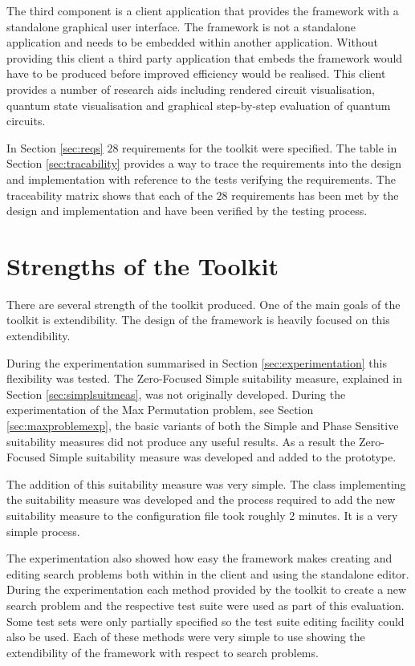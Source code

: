The third component is a client application that provides the framework with a standalone graphical user interface.
The framework is not a standalone application and needs to be embedded within another application.
Without providing this client a third party application that embeds the framework would have to be produced before improved efficiency would be realised.
This client provides a number of research aids including rendered circuit visualisation, quantum state visualisation and graphical step-by-step evaluation of quantum circuits.

In Section \ref{sec:reqs} $28$ requirements for the toolkit were specified.
The table in Section \ref{sec:tracability} provides a way to trace the requirements into the design and implementation with reference to the tests verifying the requirements.
The traceability matrix shows that each of the $28$ requirements has been met by the design and implementation and have been verified by the testing process.

\section{Strengths of the Toolkit}

There are several strength of the toolkit produced.
One of the main goals of the toolkit is extendibility.
The design of the framework is heavily focused on this extendibility.

During the experimentation summarised in Section \ref{sec:experimentation} this flexibility was tested.
The Zero-Focused Simple suitability measure, explained in Section \ref{sec:simplsuitmeas}, was not originally developed.
During the experimentation of the Max Permutation problem, see Section \ref{sec:maxproblemexp}, the basic variants of both the Simple and Phase Sensitive suitability measures did not produce any useful results.
As a result the Zero-Focused Simple suitability measure was developed and added to the prototype.

The addition of this suitability measure was very simple.
The class implementing the suitability measure was developed and the process required to add the new suitability measure to the configuration file took roughly 2 minutes.
It is a very simple process.

The experimentation also showed how easy the framework makes creating and editing search problems both within in the client and using the standalone editor.
During the experimentation each method provided by the toolkit to create a new search problem and the respective test suite were used as part of this evaluation.
Some test sets were only partially specified so the test suite editing facility could also be used.
Each of these methods were very simple to use showing the extendibility of the framework with respect to search problems.

